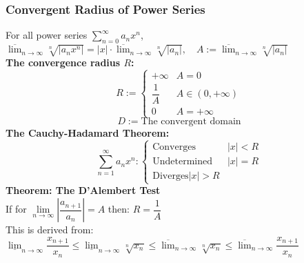 \documentclass{article}
\newcommand{\infsum}{\sum\limits_{n=1}^\infty}
\newcommand{\0}{{\bf{0}}}
\begin{document}
\subsubsection{Convergent Radius of Power Series}
For all power series $\sum\limits_{n=0}^\infty a_nx^n$, $\overline{\lim}_{n\to\infty}\sqrt[n]{|a_nx^n|}=|x|\cdot\overline{\lim}_{n\to\infty}\sqrt[n]{|a_n|},\quad A:=\overline{\lim}_{n\to\infty}\sqrt[n]{|a_n|}$\\
\textbf{The convergence radius $R$:}
$$R:=\begin{cases}
    +\infty&A=0\\
    \dfrac{1}{A}&A\in(0,+\infty)\\
    0&A=+\infty
\end{cases}$$
$$D:=\mbox{The convergent domain}$$
\textbf{The Cauchy-Hadamard Theorem:}
$$\infsum a_nx^n:\begin{cases}
    \mbox{Converges}&|x|<R\\
    \mbox{Undetermined}&|x|=R\\
    \mbox{Diverges}|x|>R&
\end{cases}$$
\textbf{Theorem: The D'Alembert Test}\\
If for $\lim\limits_{n\to\infty}\left|\dfrac{a_{n+1}}{a_n}\right|=A$ then: $R=\dfrac{1}{A}$\\
This is derived from: $\underline{\lim}_{n\to\infty}\dfrac{x_{n+1}}{x_n}\le\underline{\lim}_{n\to\infty}\sqrt[n]{x_n}\le\overline{\lim}_{n\to\infty}\sqrt[n]{x_n}\le\overline{\lim}_{n\to\infty}\dfrac{x_{n+1}}{x_n}$
\end{document}
